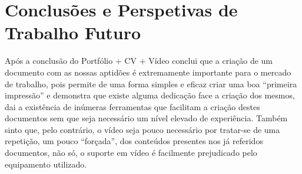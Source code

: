 \documentclass[a4paper]{article}
\begin{document}
\newpage
\section{Conclusões e Perspetivas de Trabalho Futuro}\label{con}
Após a conclusão do Portfólio + CV + Vídeo conclui que a criação de um documento com as nossas aptidões é extremamente importante 
para o mercado de trabalho, pois permite de uma forma simples e eficaz criar uma boa “primeira impressão” e demonstra que existe 
alguma dedicação face a criação dos mesmos, dai a existência de inúmeras ferramentas que facilitam a criação destes documentos sem 
que seja necessário um nível elevado de experiência. Também sinto que, pelo contrário, o vídeo seja pouco necessário por tratar-se de 
uma repetição, um pouco “forçada”, dos conteúdos presentes nos já referidos documentos, não só, o suporte em vídeo é facilmente 
prejudicado pelo equipamento utilizado.

\newpage
{}
\printbibliography
\end{document}
